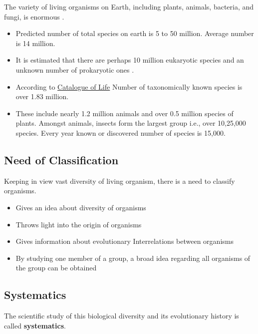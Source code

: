 \documentclass[
]{book}
\providecommand{\tightlist}{%
  \setlength{\itemsep}{0pt}\setlength{\parskip}{0pt}}
\begin{document}
The variety of living organisms on Earth, including plants, animals, bacteria, and fungi, is enormous \citep{mora2011}.

\begin{itemize}
\tightlist
\item
  Predicted number of total species on earth is 5 to 50 million. Average number is 14 million.
\item
  It is estimated that there are perhaps 10 million eukaryotic species and an unknown number of prokaryotic ones \citep{mora2011}.
\item
  According to \href{https://www.catalogueoflife.org/}{Catalogue of Life} Number of taxonomically known species is over 1.83 million.
\item
  These include nearly 1.2 million animals and over 0.5 million species of plants. Amongst animals, insects form the largest group i.e., over 10,25,000 species. Every year known or discovered number of species is 15,000.
\end{itemize}

\hypertarget{need-of-classification}{%
\subsection{Need of Classification}\label{need-of-classification}}

Keeping in view vast diversity of living organism, there is a need to classify organisms.

\begin{itemize}
\tightlist
\item
  Gives an idea about diversity of organisms
\item
  Throws light into the origin of organisms
\item
  Gives information about evolutionary Interrelations between organisms
\item
  By studying one member of a group, a broad idea regarding all organisms of the group can be obtained
\end{itemize}

\hypertarget{systematics}{%
\subsection{Systematics}\label{systematics}}

The scientific study of this biological diversity and its evolutionary history is called \textbf{systematics}.
\end{document}
